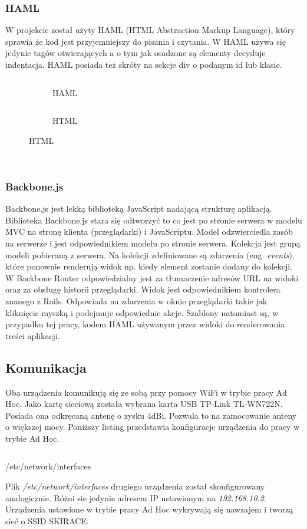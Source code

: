 \documentclass[11pt,a4paper, twoside]{article}
\begin{document}
\subsubsection{HAML}
W projekcie został użyty HAML (HTML Abstraction Markup Language), który sprawia że kod jest przyjemniejszy do pisania i czytania. W HAML używa się jedynie tagów otwierających a o tym jak osadzone są elementy decyduje indentacja. HAML posiada też skróty na sekcje div o podanym id lub klasie.
\begin{figure}[H]
\centering
\begin{subfigure}[t]{0.45\textwidth}
\caption{HAML}
\begin{listing}[H]
\inputminted[linenos=true]{haml}{./src/example.haml}
\end{listing}
\end{subfigure}
\begin{subfigure}[t]{0.45\textwidth}
\caption{HTML}
\begin{listing}[H]
\inputminted{html}{./src/example.html}
\end{listing}
\end{subfigure}
\end{figure}
$\label{haml}$
\subsubsection{Backbone.js}
Backbone.js jest lekką biblioteką JavaScript nadającą strukturę aplikacją.
Biblioteka Backbone.js stara się odtworzyć to co jest po stronie serwera w modelu MVC na stronę klienta (przeglądarki) i JavaScriptu. Model odzwierciedla zasób na serwerze i jest odpowiednikiem modelu po stronie serwera. Kolekcja jest grupą modeli pobieraną z serwera. Na kolekcji zdefiniowane są zdarzenia (eng. \emph{events}), które ponownie renderują widok np. kiedy element zostanie dodany do kolekcji. W Backbone Router odpowiedzialny jest za tłumaczenie adresów URL na widoki oraz za obsługę historii przeglądarki. Widok jest odpowiednikiem kontrolera znanego z Rails. Odpowiada na zdarzenia w oknie przeglądarki takie jak kliknięcie myszką i podejmuje odpowiednie akcje. Szablony natomiast są, w przypadku tej pracy, kodem HAML używanym przez widoki do renderowania treści aplikacji.
\newpage
\subsection{Komunikacja}
Oba urządzenia komunikują się ze sobą przy pomocy WiFi w trybie pracy Ad Hoc. Jako kartę sieciową została wybrana karta USB TP-Link \mbox{TL-WN722N}. Posiada ona odkręcaną antenę o zysku 4dBi. Pozwala to na zamocowanie anteny o większej mocy. Poniższy listing przedstawia konfiguracje urządzenia do pracy w trybie Ad Hoc.
\begin{listing}[H]
\inputminted[linenos=true]{sh}{./src/adhoc}
\caption{/etc/network/interfaces}
\end{listing}
Plik \emph{/etc/network/interfaces} drugiego urządzenia został skonfigurowany analogicznie. Różni sie jedynie adresem IP ustawionym na \emph{192.168.10.2}. Urządzenia ustawione w trybie pracy Ad Hoc wykrywają się nawzajem i tworzą sieć o SSID SKIRACE.
\end{document}

